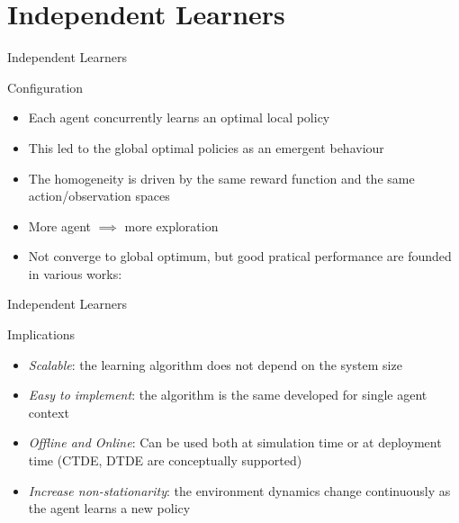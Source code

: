 \documentclass[presentation]{beamer}\mode<presentation>{\usetheme{AMSBolognaFC}}
\begin{document}
\section{Independent Learners}
\begin{frame}{Independent Learners}
	\begin{exampleblock}{Configuration}
		\begin{itemize}
			\item Each agent concurrently learns an optimal local policy
			\item This led to the global optimal policies as an emergent behaviour
			\item The homogeneity is driven by the same reward function and the same action/observation spaces
			\item More agent $\implies$ more exploration
			\item Not converge to global optimum, but good pratical performance are founded in various works: \parencite{DBLP:conf/atal/TumerA07, DBLP:conf/atal/TumerAW02, DBLP:conf/iros/WangS06}
		\end{itemize}
	\end{exampleblock}
\end{frame}
\begin{frame}{Independent Learners}
	\begin{exampleblock}{Implications}
		\begin{itemize}
			\item [{\color{teal} \faThumbsUp}] \emph{Scalable}: the learning algorithm does not depend on the system size
			\item [{\color{teal} \faThumbsUp}] \emph{Easy to implement}: the algorithm is the same developed for single agent context
			\item [{\color{teal} \faThumbsUp}] \emph{Offline and Online}: Can be used both at simulation time or at deployment time (CTDE, DTDE are conceptually supported)
			\item [{\color{red} \faThumbsDown}] \emph{Increase non-stationarity}: the environment dynamics change continuously as the agent learns a new policy
		\end{itemize}
	\end{exampleblock}
\end{frame}
\end{document}
